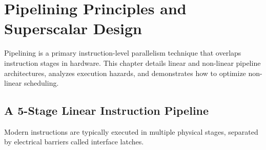 \documentclass[12pt,a4paper,openany]{book}
\begin{document}
\chapter{Pipelining Principles and Superscalar Design}

Pipelining is a primary instruction-level parallelism technique that overlaps instruction stages in hardware. This chapter details linear and non-linear pipeline architectures, analyzes execution hazards, and demonstrates how to optimize non-linear scheduling.

\section{A 5-Stage Linear Instruction Pipeline}
Modern instructions are typically executed in multiple physical stages, separated by electrical barriers called interface latches.
\end{document}
